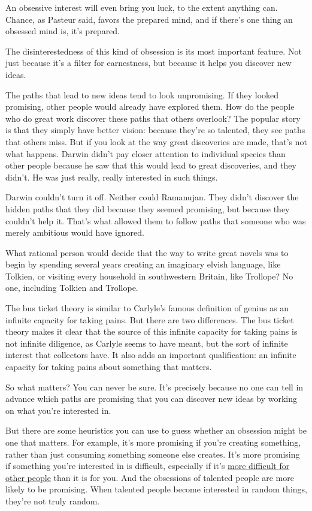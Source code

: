 An obsessive interest will even bring you luck, to the extent anything
can. Chance, as Pasteur said, favors the prepared mind, and if there's
one thing an obsessed mind is, it's prepared.

The disinterestedness of this kind of obsession is its most important
feature. Not just because it's a filter for earnestness, but because it
helps you discover new ideas.

The paths that lead to new ideas tend to look unpromising. If they
looked promising, other people would already have explored them. How do
the people who do great work discover these paths that others overlook?
The popular story is that they simply have better vision: because
they're so talented, they see paths that others miss. But if you look at
the way great discoveries are made, that's not what happens. Darwin
didn't pay closer attention to individual species than other people
because he saw that this would lead to great discoveries, and they
didn't. He was just really, really interested in such things.

Darwin couldn't turn it off. Neither could Ramanujan. They didn't
discover the hidden paths that they did because they seemed promising,
but because they couldn't help it. That's what allowed them to follow
paths that someone who was merely ambitious would have ignored.

What rational person would decide that the way to write great novels was
to begin by spending several years creating an imaginary elvish
language, like Tolkien, or visiting every household in southwestern
Britain, like Trollope? No one, including Tolkien and Trollope.

The bus ticket theory is similar to Carlyle's famous definition of
genius as an infinite capacity for taking pains. But there are two
differences. The bus ticket theory makes it clear that the source of
this infinite capacity for taking pains is not infinite diligence, as
Carlyle seems to have meant, but the sort of infinite interest that
collectors have. It also adds an important qualification: an infinite
capacity for taking pains about something that matters.

So what matters? You can never be sure. It's precisely because no one
can tell in advance which paths are promising that you can discover new
ideas by working on what you're interested in.

But there are some heuristics you can use to guess whether an obsession
might be one that matters. For example, it's more promising if you're
creating something, rather than just consuming something someone else
creates. It's more promising if something you're interested in is
difficult, especially if it's \href{work.html}{more difficult for other
people} than it is for you. And the obsessions of talented people are
more likely to be promising. When talented people become interested in
random things, they're not truly random.

